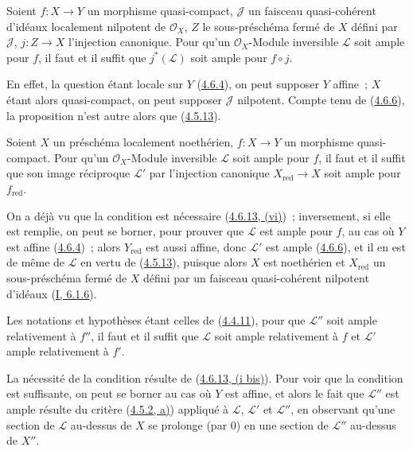 \begin{proposition}[4.6.15]
\label{II.4.6.15-fr}
Soient $f:X\to Y$ un morphisme quasi-compact, $\mathcal{J}$ un faisceau
quasi-cohérent d'idéaux localement nilpotent de $\mathcal{O}_X$, $Z$ le
sous-préschéma fermé de $X$ défini par $\mathcal{J}$, $j:Z\to X$
l'injection canonique. Pour qu'un $\mathcal{O}_X$-Module inversible
$\mathcal{L}$ soit ample pour $f$, il faut et il suffit que
$j^*(\mathcal{L})$ soit ample pour $f\circ j$.
\end{proposition}

En effet, la question étant locale sur $Y$
(\hyperref[II.4.6.4-fr]{4.6.4}), on peut supposer $Y$ affine~; $X$ étant
alors quasi-compact, on peut supposer $\mathcal{J}$ nilpotent. Compte tenu
de (\hyperref[II.4.6.6-fr]{4.6.6}), la proposition n'est autre alors que
(\hyperref[II.4.5.13-fr]{4.5.13}).

\begin{corollary}[4.6.16]
\label{II.4.6.16-fr}
Soient $X$ un préschéma localement noethérien, $f:X\to Y$ un morphisme
quasi-compact. Pour qu'un $\mathcal{O}_X$-Module inversible $\mathcal{L}$
soit ample pour $f$, il faut et il suffit que son image réciproque
$\mathcal{L}'$ par l'injection canonique $X_{\mathrm{red}}\to X$ soit ample
pour $f_{\mathrm{red}}$.
\end{corollary}

On a déjà vu que la condition est nécessaire
(\hyperref[II.4.6.13-fr]{4.6.13, (vi)})~; inversement, si elle est remplie,
on peut se borner, pour prouver que $\mathcal{L}$ est ample pour $f$, au
cas où $Y$ est affine (\hyperref[II.4.6.4-fr]{4.6.4})~; alors
$Y_{\mathrm{red}}$ est aussi affine, donc $\mathcal{L}'$ est ample
(\hyperref[II.4.6.6-fr]{4.6.6}), et il en est de même de $\mathcal{L}$ en
vertu de (\hyperref[II.4.5.13-fr]{4.5.13}), puisque alors $X$ est
noethérien et $X_{\mathrm{red}}$ un sous-préschéma fermé de $X$ défini par
un faisceau quasi-cohérent nilpotent d'idéaux
(\hyperref[I.6.1.6-fr]{I, 6.1.6}).

\begin{proposition}[4.6.17]
\label{II.4.6.17-fr}
Les notations et hypothèses étant celles de
(\hyperref[II.4.4.11-fr]{4.4.11}), pour que $\mathcal{L}''$ soit ample
relativement à $f''$, il faut et il suffit que $\mathcal{L}$ soit ample
relativement à $f$ et $\mathcal{L}'$ ample relativement à $f'$.
\end{proposition}


La nécessité de la condition résulte de
(\hyperref[II.4.6.13-fr]{4.6.13, (i bis)}). Pour voir que la condition est
suffisante, on peut se borner au cas où $Y$ est affine, et alors le fait
que $\mathcal{L}''$ est ample résulte du critère
(\hyperref[II.4.5.2-fr]{4.5.2, a)}) appliqué à $\mathcal{L}$,
$\mathcal{L}'$ et $\mathcal{L}''$, en observant qu'une section de
$\mathcal{L}$ au-dessus de $X$ se prolonge (par $0$) en une section de
$\mathcal{L}''$ au-dessus de $X''$.

